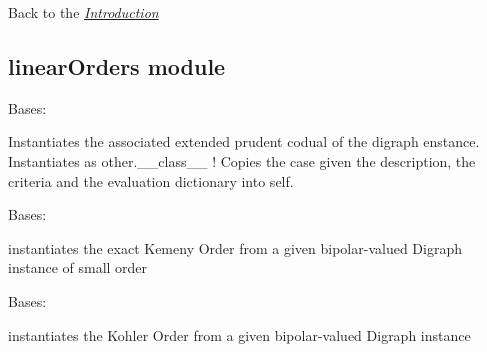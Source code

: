 \documentclass[letterpaper,10pt,english]{sphinxmanual}
\begin{document}
Back to the {\hyperref[techDoc:introduction-label]{\emph{Introduction}}}


\subsection{linearOrders module}
\label{techDoc:linearorders-module}\label{techDoc:linearorders-label}\label{techDoc:module-linearOrders}

\begin{fulllineitems}
\label{techDoc:linearOrders.ExtendedPrudentDigraph}
Bases: {\hyperref[techDoc:digraphs.Digraph]{}}

Instantiates the associated extended prudent
codual of the digraph enstance.
Instantiates as other.\_\_class\_\_ !
Copies the case given the description, the criteria
and the evaluation dictionary into self.

\end{fulllineitems}


\begin{fulllineitems}
\label{techDoc:linearOrders.KemenyOrder}
Bases: {\hyperref[techDoc:linearOrders.LinearOrder]{}}

instantiates the exact Kemeny Order from
a given bipolar-valued Digraph instance of small order

\end{fulllineitems}


\begin{fulllineitems}
\label{techDoc:linearOrders.KohlerOrder}
Bases: {\hyperref[techDoc:linearOrders.LinearOrder]{}}

instantiates the Kohler Order from
a given bipolar-valued Digraph instance

\end{fulllineitems}
\end{document}
